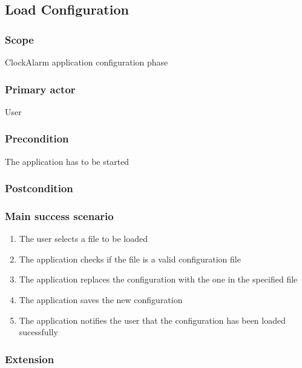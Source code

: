 \subsection{Load Configuration}

\subsubsection{Scope}
ClockAlarm application configuration phase
\subsubsection{Primary actor}
User
\subsubsection{Precondition}
The application has to be started
\subsubsection{Postcondition}

\subsubsection{Main success scenario}
\begin{enumerate}
\item The user selects a file to be loaded
\item The application checks if the file is a valid configuration file
\item The application replaces the configuration with the one in the specified file
\item The application saves the new configuration
\item The application notifies the user that the configuration has been loaded sucessfully
\end{enumerate}
\subsubsection{Extension}
